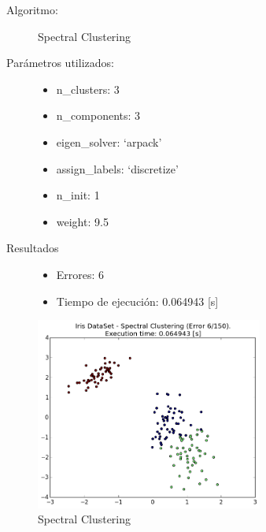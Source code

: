 \documentclass{article}
\begin{document}
\begin{description}
  \item[Algoritmo:] Spectral Clustering
  \item[Parámetros utilizados:] \hfill
    \begin{itemize}
      \item n\_clusters: 3
      \item n\_components: 3
      \item eigen\_solver: ‘arpack’
      \item assign\_labels: ‘discretize’
      \item n\_init: 1
      \item weight: 9.5
    \end{itemize}
  \item[Resultados]\hfill
    \begin{itemize}
      \item Errores: 6
      \item Tiempo de ejecución: 0.064943 [s]
    \end{itemize}
\end{description}

\begin{figure}[H]
  \centering
  \includegraphics[width=0.666\textwidth]{img/SpectralClustering.png}
  \caption{Spectral Clustering}
\end{figure}

\newpage
\end{document}

